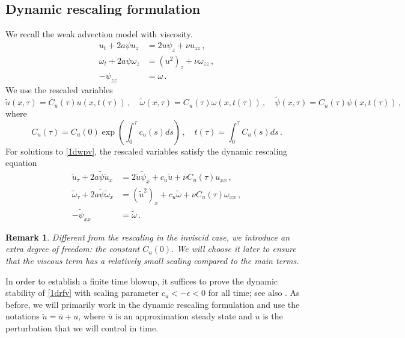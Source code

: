 \documentclass[12pt]{caltech_thesis}
\newtheorem{remark}[theorem]{Remark}
\numberwithin{equation}{section}
\begin{document}
\subsection{Dynamic rescaling formulation}
We recall the weak advection  model with viscosity.
\begin{equation}
\label{1dwpv}
\begin{aligned}
u_{ t}+2 a\psi u_{ z} &=2 u \psi_{ z}+\nu u_{zz}\,, \\
\omega_{ t}+2 a\psi\omega_{ z} &=\left(u^{2}\right)_{z}+\nu \omega_{zz}\,, \\
- \psi_{zz} &=\omega\,.
\end{aligned}
\end{equation}
We use  the rescaled variables $$\tilde{u}(x, \tau)=C_{u}(\tau)  u( x, t(\tau))\,,\quad \tilde{\omega}(x, \tau)=C_{u}(\tau)  \omega( x, t(\tau))\,,\quad \tilde{\psi}(x, \tau)=C_{u}(\tau)  \psi(x, t(\tau))\,,$$ where $$
C_{u}(\tau)=C_{u}(0)\exp \left(\int_{0}^{\tau} c_{u}(s) d s\right)\,, \quad t(\tau)=\int_{0}^{\tau} C_{u}(s) d s\,.$$ For solutions to \eqref{1dwpv}, the rescaled variables satisfy the dynamic rescaling equation 
\begin{equation}
\label{1drfv}
\begin{aligned}
\tilde{u}_{\tau}+2a \tilde{\psi}\tilde{u}_{ x} &=2 \tilde{u} \tilde{\psi}_{ x}+c_u \tilde{u}+\nu C_u(\tau)u_{xx}\,, \\
\tilde{\omega}_{ \tau}+2a \tilde{\psi}\tilde{\omega}_{ x} &=\left(\tilde{u}^{2}\right)_{x}+c_{u}\tilde{\omega}+\nu C_u(\tau) \omega_{xx}\,, \\
-\tilde{\psi}_{xx} &=\tilde{\omega}\,.
\end{aligned}
\end{equation}
\begin{remark}
    Different from the rescaling in the inviscid case, we introduce an extra degree of freedom: the constant $C_u(0)$. We will choose it later to ensure that the viscous term has a relatively small scaling compared to the main terms.
\end{remark}
In order to establish a finite time blowup, it suffices to prove the dynamic stability of \eqref{1drfv} with scaling parameter $c_u<-\epsilon<0$ for all time; see also \cite{chen2021finite}.
As before, we will primarily work in the dynamic rescaling formulation and use the notations $\tilde{u}=\bar{u} +u$, where $\bar{u}$ is an approximation steady state and $u$ is the perturbation that we will control in time.  
\end{document}
